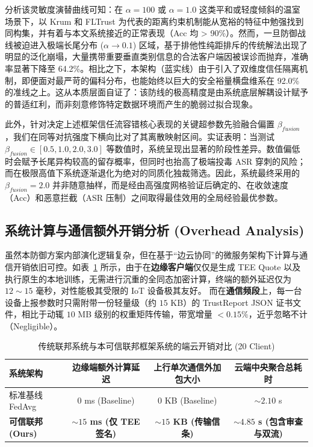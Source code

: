 \documentclass[runningheads]{llncs}
\begin{document}
分析该灵敏度演替曲线可知：在 $\alpha=100$ 或 $\alpha=1.0$ 这类平和或轻度倾斜的温室场景下，以 Krum 和 FLTrust 为代表的距离约束机制能从宽裕的特征中勉强找到同构集，并有着与本文系统接近的正常表现（Acc 均 > 90\%）。然而，一旦防御战线被迫进入极端长尾分布 ($\alpha \to 0.1$) 区域，基于排他性纯距排斥的传统解法出现了明显的泛化崩塌，大量携带重要垂直类别信息的合法客户端因被误诊而抛弃，准确率显著下降至 64.2\%。相比之下，本架构（蓝实线）由于引入了双维度信任隔离机制，即便面对最严苛的偏科分布，也能始终以巨大的安全裕量横盘维系在 92.0\% 的准线之上。这从本质层面自证了：该防线的极高精度是由系统底层解耦设计赋予的普适红利，而非刻意修饰特定数据环境而产生的脆弱过拟合现象。

此外，针对决定上述框架信任流容错核心表现的关键超参数先验融合偏置 $\beta_{fusion}$，我们在同等对抗强度下横向比对了其离散映射区间。实证表明：当测试 $\beta_{fusion} \in [0.5, 1.0, 2.0, 3.0]$ 等数值时，系统呈现出显著的阶段性差异。数值偏低时会赋予长尾异构较高的留存概率，但同时也抬高了极端投毒 ASR 穿刺的风险；而在极限高值下系统逐渐退化为绝对的同质化独裁筛选。因此，系统最终采用的 $\beta_{fusion} = 2.0$ 并非随意抽样，而是经由高强度网格验证后确定的、在收敛速度（Acc）和恶意拦截（ASR 压制）之间取得最佳效用的全局经验最优参数。

\subsection{系统计算与通信额外开销分析 (Overhead Analysis)}
虽然本防御方案内部演化逻辑复杂，但在基于“边云协同”的微服务架构下计算与通信开销依旧可控。如表~\ref{tab:overhead} 所示，由于在\textbf{边缘客户端}仅仅是生成 TEE Quote 以及执行原生的本地训练，无需进行沉重的全同态加密计算，终端的额外延迟仅为 $12 \sim 15$ 毫秒，对性能极其受限的 IoT 设备极其友好。
而在\textbf{通信频段}上，每一台设备上报参数时只需附带一份轻量级（约 $15$ KB）的 TrustReport JSON 证书文件，相比于动辄 $10$ MB 级别的权重矩阵传输，带宽增量 $<0.15\%$，近乎忽略不计（Negligible）。

\begin{table}[htbp]
\centering
\caption{传统联邦系统与本可信联邦框架系统的端云开销对比 (20 Client)}
\vspace{4pt}
\label{tab:overhead}
\begin{tabular}{l c c c}
\toprule
\textbf{系统架构} & \textbf{边缘端额外计算延迟} & \textbf{上行单次通信外加包大小} & \textbf{云端中央聚合总耗时} \\
\midrule
标准基线 FedAvg & 0 ms (Baseline) & 0 KB (Baseline) & $\sim 2.10$ s \\
\textbf{可信联邦 (Ours)} & \textbf{$\sim 15$ ms (仅 TEE 签名)} & \textbf{$\sim 15$ KB (传输信条)} & \textbf{$\sim 4.85$ s (包含审查与双流)} \\
\bottomrule
\end{tabular}
\end{table}
\end{document}
